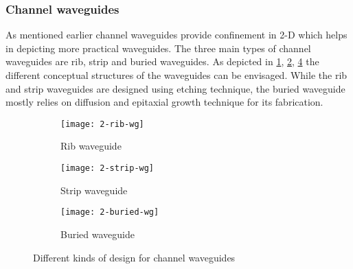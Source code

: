 \documentclass[../report.tex]{subfiles}
\begin{document}
		\subsubsection{Channel waveguides}			
As mentioned earlier channel waveguides provide confinement in 2-D which helps in depicting more practical waveguides. The three main types of channel waveguides are rib, strip and buried waveguides. As depicted in \ref{fig:2_rib_wg}, \ref{fig:2_strip_wg}, \ref{fig:2_buried_wg} the different conceptual structures of the waveguides can be envisaged. While the rib and strip waveguides are designed using etching technique, the buried waveguide mostly relies on diffusion and epitaxial growth technique for its fabrication.
\begin{figure}[H] %
	\begin{subfigure}[t]{0.3\textwidth}
		\texttt{[image: 2-rib-wg]}
		\caption{Rib waveguide}
		\label{fig:2_rib_wg}
	\end{subfigure}
	\hfill
	\begin{subfigure}[t]{0.3\textwidth}
		\texttt{[image: 2-strip-wg]}
		\caption{Strip waveguide}
		\label{fig:2_strip_wg}
	\end{subfigure}
	\hfill
	\begin{subfigure}[t]{0.3\textwidth}
		\texttt{[image: 2-buried-wg]}
		\caption{Buried waveguide}
		\label{fig:2_buried_wg}
	\end{subfigure}
	\caption{Different kinds of design for channel waveguides}
\end{figure}
\end{document}
